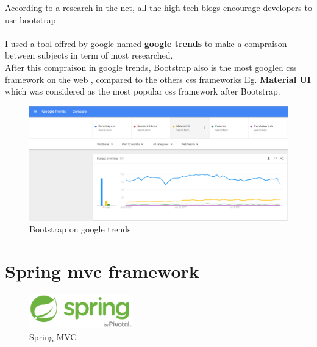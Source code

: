\vspace{66mm}
According to a research in the net, all the high-tech blogs encourage developers to use bootstrap.
\\
\\
 I used a tool offred by google named \textbf{google trends} to make a compraison between subjects in term of most researched.
 \\
 After this compraison in google trends, Bootstrap also is the most googled css framework on the web , compared to the others css frameworks Eg. \textbf{Material UI} which was considered as the most popular css framework after Bootstrap.

\begin{figure}[h]
	\centering
	\includegraphics[width=1\textwidth]{Boostrap_statics_google_trends.png}
	\caption{Bootstrap on google trends}
\end{figure}

\clearpage
\newpage


\section{Spring mvc framework}
\begin{figure}[h]
	\centering
	\includegraphics[width=0.4\textwidth]{Spring_logo.png}
	\caption{Spring MVC}
\end{figure}

